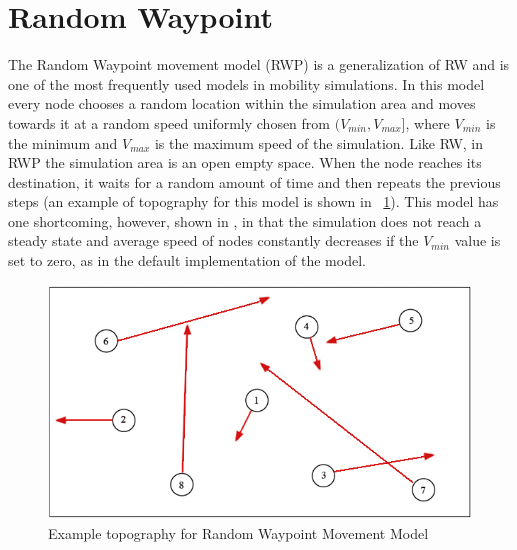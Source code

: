 \section{Random Waypoint}
The Random Waypoint movement model (RWP) is a generalization of RW and is one of the most frequently used models in mobility simulations. In this model every node chooses a random location within the simulation area and moves towards it at a random speed uniformly chosen from $(V_{min}, V_{max}]$, where $V_{min}$ is the minimum and $V_{max}$ is the maximum speed of the simulation. Like RW, in RWP the simulation area is an open empty space. When the node reaches its destination, it waits for a random amount of time and then repeats the previous steps (an example of topography for this model is shown in \figurename~\ref{fig:random_waypoint}). This model has one shortcoming, however, shown in \cite{rwpharmful}, in that the simulation does not reach a steady state and average speed of nodes constantly decreases if the $V_{min}$ value is set to zero, as in the default implementation of the model. 
\begin{figure}[htpb]
  \begin{center}
    \includegraphics[scale=0.6]{4-movimento/img/random_waypoint.png}
    \caption{Example topography for Random Waypoint Movement Model}    
    \label{fig:random_waypoint}
  \end{center}
\end{figure}

